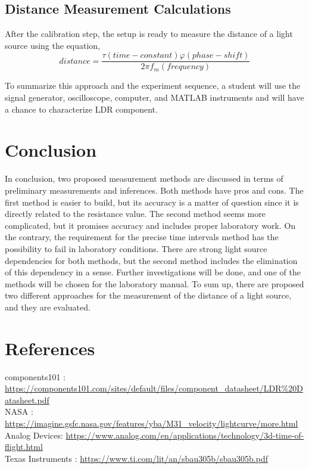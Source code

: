 \documentclass[letterpaper,12pt]{article}
\begin{document}
\subsection{Distance Measurement Calculations}
After the calibration step, the setup is ready to measure the distance of a light source using the equation,
\[distance = \frac{  \tau (time-constant)  \varphi (phase-shift)  }{2 \pi f_m (frequency)}\]

To summarize this approach and the experiment sequence, a student will use the signal generator, oscilloscope, computer, and MATLAB instruments and will have a chance to characterize LDR component. 
\section{Conclusion}
In conclusion, two proposed measurement methods are discussed in terms of preliminary measurements and inferences. Both methods have pros and cons. The first method is easier to build, but its accuracy is a matter of question since it is directly related to the resistance value. The second method seems more complicated, but it promises accuracy and includes proper laboratory work. On the contrary, the requirement for the precise time intervals method has the possibility to fail in laboratory conditions. There are strong light source dependencies for both methods, but the second method includes the elimination of this dependency in a sense. Further investigations will be done, and one of the methods will be chosen for the laboratory manual. To sum up, there are proposed two different approaches for the measurement of the distance of a light source, and they are evaluated.   




\section*{References}
\label{sec:ref}
components101 : \url{https://components101.com/sites/default/files/component_datasheet/LDR\%20Datasheet.pdf} \\

NASA : \url{https://imagine.gsfc.nasa.gov/features/yba/M31_velocity/lightcurve/more.html} \\

Analog Devices: \url{https://www.analog.com/en/applications/technology/3d-time-of-flight.html} \\

Texas Instruments : \url{https://www.ti.com/lit/an/sbau305b/sbau305b.pdf} \\
\end{document}

